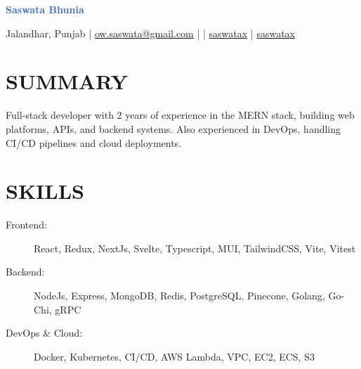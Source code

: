 \documentclass[]{resume}
\begin{document}
\textrm{\Huge\textcolor{highlight}{\textbf{Saswata Bhunia}}}
\vspace{.4em}

Jalandhar, Punjab | \href{mailto:ow.saswata@gmail.com}{\faEnvelope \space ow.saswata@gmail.com} | \faPhone {} | \href{https://www.linkedin.com/in/saswatax}{\faLinkedin \space saswatax} | \href{https://github.com/saswatax}{\faGithub \space saswatax}
\vspace{.4em}

\section{SUMMARY}
Full-stack developer with 2 years of experience in the MERN stack, building web platforms, APIs, and backend systems. Also experienced in DevOps, handling CI/CD pipelines and cloud deployments.

\section{SKILLS}
\begin{description}
  \item[Frontend:] React, Redux, NextJs, Svelte, Typescript, MUI, TailwindCSS, Vite, Vitest
  \item[Backend:] NodeJs, Express, MongoDB, Redis, PostgreSQL, Pinecone, Golang, Go-Chi, gRPC
  \item[DevOps \& Cloud:] Docker, Kubernetes, CI/CD, AWS Lambda, VPC, EC2, ECS, S3
\end{description}
\end{document}

